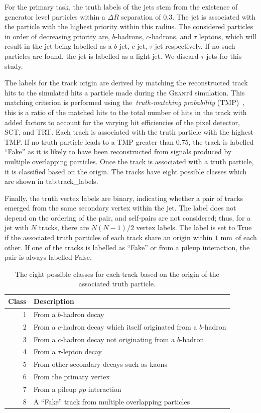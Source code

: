 For the primary task, the truth labels of the jets stem from the existence of generator level particles within a $\Delta R$ separation of 0.3.
The jet is associated with the particle with the highest priority within this radius.
The considered particles in order of decreasing priority are, $b$-hadrons, $c$-hadrons, and $\tau$ leptons, which will result in the jet being labelled as a $b$-jet, $c$-jet, $\tau$-jet respectively.
If no such particles are found, the jet is labelled as a light-jet.
We discard $\tau$-jets for this study.

The labels for the track origin are derived by matching the reconstructed track hits to the simulated hits a particle made during the \textsc{Geant4} simulation.
This matching criterion is performed using the~\textit{truth-matching probability} (TMP)~\cite{PerformanceATLASTrack}, this is a ratio of the matched hits to the total number of hits in the track with added factors to account for the varying hit efficiencies of the pixel detector, SCT, and TRT\@.
Each track is associated with the truth particle with the highest TMP\@.
If no truth particle leads to a TMP greater than 0.75, the track is labelled ``Fake'' as it is likely to have been reconstructed from signals produced by multiple overlapping particles.
Once the track is associated with a truth particle, it is classified based on the origin.
The tracks have eight possible classes which are shown in \Cref
{tab:track_labels}.

Finally, the truth vertex labels are binary, indicating whether a pair of tracks emerged from the same secondary vertex within the jet.
The label does not depend on the ordering of the pair, and self-pairs are not considered; thus, for a jet with $N$ tracks, there are $N(N-1)/2$ vertex labels.
The label is set to True if the associated truth particles of each track share an origin within $1~\mm$ of each other.
If one of the tracks is labelled as ``Fake'' or from a pileup interaction, the pair is always labelled False.

\begin{table}
    \centering
    \begin{tabular}{rl}
        \toprule
        Class & Description \\
        \midrule
        1 & From a $b$-hadron decay \\
        2 & From a $c$-hadron decay which itself originated from a $b$-hadron \\
        3 & From a $c$-hadron decay not originating from a $b$-hadron \\
        4 & From a $\tau$-lepton decay \\
        5 & From other secondary decays such as kaons \\
        6 & From the primary vertex \\
        7 & From a pileup $pp$ interaction \\
        8 & A ``Fake'' track from multiple overlapping particles \\
        \bottomrule
    \end{tabular}
    \caption{The eight possible classes for each track based on the origin of the associated truth particle.}
    \label{tab:track_labels}
\end{table}

